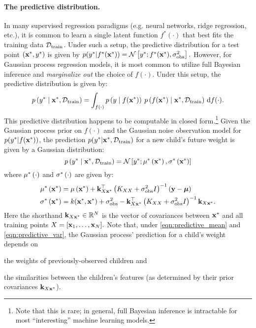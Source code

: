 \paragraph{The predictive distribution.}
In many supervised regression paradigms (e.g. neural networks, ridge regression, etc.), it is common to learn a single latent function $f^*(\cdot)$ that best fits the training data $\mathcal D_\text{train}$.
Under such a setup, the predictive distribution for a test point $(\mathbf{x}^*, y^*)$ is given by
$ p(y^* \vert f^*(\mathbf{x}^*)) = \mathcal{N} \left[  y^*; f^*(\mathbf{x}^*) ,  \sigma^2_\text{obs}  \right]. $
However, for Gaussian process regression models, it is most common to utilize full Bayesian inference and \emph{marginalize out} the choice of $f(\cdot)$.
Under this setup, the predictive distribution is given by:
\begin{equation*}
  p \left( y^* \mid \mathbf{x}^*, \mathcal D_\text{train} \right)
  = \int_{f(\cdot)} p\left( y \mid f(\mathbf{x}^*) \right) \: p\left( f(\mathbf{x}^*) \mid \mathbf{x}^*, \mathcal D_\text{train} \right)
  \,\mathrm{d}{f}(\cdot).
\end{equation*}
%
This predictive distribution happens to be computable in closed form.\footnote{
  Note that this is rare; in general, full Bayesian inference is intractable for most ``interesting'' machine learning models.
}
Given the Gaussian process prior on $f(\cdot)$ and the Gaussian noise observation model for $p(y^* \vert f(\mathbf{x}^*))$, the prediction $p(y^* \vert \mathbf{x}^*, \mathcal D_\text{train})$ for a new child's future weight is given by a Gaussian distribution:
%
\begin{equation}
  p \left(
    y^* \mid \mathbf{x}^*, \mathcal D_\text{train}
  \right)
  = \mathcal{N} \left[  y^* ; \mu^* \left( \mathbf{x}^* \right),  \sigma^* \left( \mathbf{x}^* \right)  \right]
  \label{eqn:predictive}
\end{equation}
%
where $\mu^* \left( \cdot \right)$ and $\sigma^* \left( \cdot \right)$ are given by:
%
\begin{align}
  \mu^* \left( \mathbf{x}^* \right)
  &= \mu\left( \mathbf{x}^* \right) + \mathbf{k}_{X \mathbf{x}^*}^\top \left( K_{XX} + \sigma_\text{obs}^2 I \right)^{-1} \left( \mathbf{y} - \boldsymbol{\mu} \right)
  \label{eqn:predictive_mean}
  \\
  \sigma^* \left( \mathbf{x}^* \right)
  &= k ( \mathbf{x}^*, \mathbf{x}^*) + \sigma^2_\text{obs} - \mathbf{k}_{X \mathbf{x}^*}^\top \left( K_{XX} + \sigma_\text{obs}^2 I \right)^{-1} \mathbf{k}_{X \mathbf{x}^*}.
  \label{eqn:predictive_var}
\end{align}
%
Here the shorthand $\mathbf{k}_{X \mathbf{x}^*} \in \mathbb{R}^N$ is the vector of covariances between $\mathbf{x}^*$ and all training points $X = [\mathbf{x}_1, \ldots, \mathbf{x}_N].$
Note that, under \cref{eqn:predictive_mean} and \cref{eqn:predictive_var}, the Gaussian process' prediction for a child's weight depends on
\begin{enumerate*}
  \item the weights of previously-observed children and
  \item the similarities between the children's features (as determined by their prior covariances $\mathbf{k}_{X \mathbf{x}^*}$).
\end{enumerate*}

